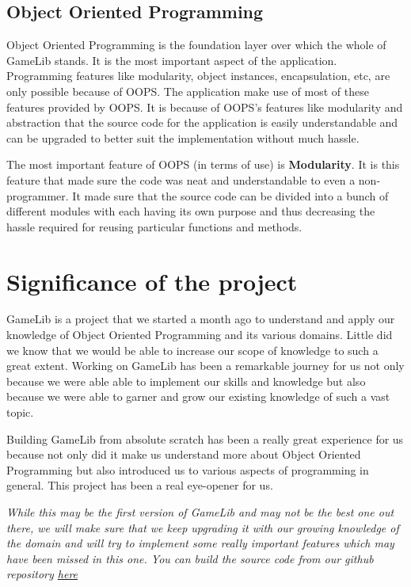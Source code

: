 \documentclass[12pt]{article}
\begin{document}
		\subsection{Object Oriented Programming}
		\begin{flushleft}
			\setlength{\parindent}{10ex}
			Object Oriented Programming is the foundation layer over which the whole of GameLib stands. It is the most important aspect of the application. Programming features like modularity, object instances, encapsulation, etc, are only possible because of OOPS. The application make use of most of these features provided by OOPS. It is because of OOPS's features like modularity and abstraction that the source code for the application is easily understandable and can be upgraded to better suit the implementation without much hassle. \par 
			The most important feature of OOPS (in terms of use) is {\bf Modularity}. It is this feature that made sure the code was neat and understandable to even a non-programmer. It made sure that the source code can be divided into a bunch of different modules with each having its own purpose and thus decreasing the hassle required for reusing particular functions and methods. \par 
		\end{flushleft}
	
		\clearpage
		
		\section{Significance of the project}
		\begin{flushleft}
			\setlength{\parindent}{10ex}
			GameLib is a project that we started a month ago to understand and apply our knowledge of Object Oriented Programming and its various domains. Little did we know that we would be able to increase our scope of knowledge to such a great extent. Working on GameLib has been a remarkable journey for us not only because we were able able to implement our skills and knowledge but also because we were able to garner and grow our existing knowledge of such a vast topic. \par
			Building GameLib from absolute scratch has been a really great experience for us because not only did it make us understand more about Object Oriented Programming but also introduced us to various aspects of programming in general. This project has been a real eye-opener for us. \par 
			{\it While this may be the first version of GameLib and may not be the best one out there, we will make sure that we keep upgrading it with our growing knowledge of the domain and will try to implement some really important features which may have been missed in this one. You can build the source code from our github repository \href{https://github.com/DivyanshFalodiya/GameLib}{here}}
		\end{flushleft}
		\clearpage
		
		\clearpage
		
	
\end{document}
